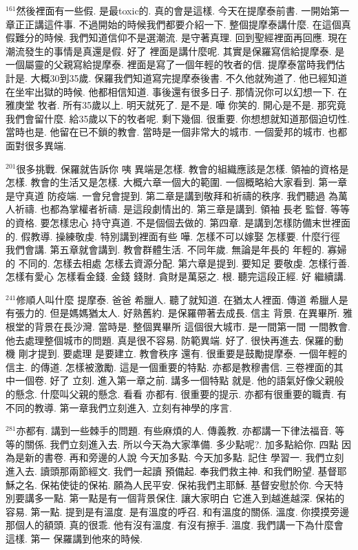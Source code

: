 \documentclass{book}
\begin{document}
$^{161}$然後裡面有一些假.
是最toxic的.
真的會是這樣.
今天在提摩泰前書.
一開始第一章正正講這件事.
不過開始的時候我們都要介紹一下.
整個提摩泰講什麼.
在這個真假難分的時候.
我們知道信仰不是選潮流.
是守著真理.
回到聖經裡面再回應.
現在潮流發生的事情是真還是假.
好了 裡面是講什麼呢.
其實是保羅寫信給提摩泰.
是一個屬靈的父親寫給提摩泰.
裡面是寫了一個年輕的牧者的信.
提摩泰當時我們估計是.
大概30到35歲.
保羅我們知道寫完提摩泰後書.
不久他就殉道了.
他已經知道在坐牢出獄的時候.
他都相信知道.
事後還有很多日子.
那情況你可以幻想一下.
在雅庚堂 牧者.
所有35歲以上.
明天就死了.
是不是.
嘩 你笑的.
開心是不是.
那究竟我們會留什麼.
給35歲以下的牧者呢.
剩下幾個.
很重要.
你想想就知道那個迫切性.
當時也是.
他留在已不鎖的教會.
當時是一個非常大的城市.
一個愛邦的城市.
也都面對很多異端.

$^{201}$很多挑戰.
保羅就告訴你 咦 異端是怎樣.
教會的組織應該是怎樣.
領袖的資格是怎樣.
教會的生活又是怎樣.
大概六章一個大的範圍.
一個概略給大家看到.
第一章是守真道 防疫端.
一會兒會提到.
第二章是講到敬拜和祈禱的秩序.
我們聽過 為萬人祈禱.
也都為掌權者祈禱.
是這段劇情出的.
第三章是講到.
領袖 長老 監督.
等等的資格.
要怎樣忠心 持守真道.
不是個個去做的.
第四章.
是講到怎樣防備末世裡面的.
假教導.
操練敬虔.
特別講到裡面有些 嘩.
怎樣不可以嫁娶 怎樣要.
什麼行徑 我們會講.
第五章就會講到.
教會群體生活.
不同年歲.
無論是年長的 年輕的.
寡婦的 不同的.
怎樣去相處 怎樣去資源分配.
第六章是提到.
要知足 要敬虔.
怎樣行善.
怎樣有愛心 怎樣看金錢.
金錢 錢財.
貪財是萬惡之.
根.
聽完這段正經.
好 繼續講.

$^{241}$修順人叫什麼 提摩泰.
爸爸 希臘人.
聽了就知道.
在猶太人裡面.
傳道 希臘人是有張力的.
但是媽媽猶太人.
好熟舊約.
是保羅帶著去成長.
信主 背景.
在異畢所.
雅根堂的背景在長沙灣.
當時是.
整個異畢所 這個很大城市.
是一間第一間 一間教會.
他去處理整個城市的問題.
真是很不容易.
防範異端.
好了.
很快再進去.
保羅的動機 剛才提到.
要處理 是要建立.
教會秩序 還有.
很重要是鼓勵提摩泰.
一個年輕的信主.
的傳道.
怎樣被激勵.
這是一個重要的特點.
亦都是教穆書信.
三卷裡面的其中一個卷.
好了 立刻.
進入第一章之前.
講多一個特點 就是.
他的語氣好像父親般的懸念.
什麼叫父親的懸念.
看看 亦都有.
很重要的提示.
亦都有很重要的職責.
有不同的教導.
第一章我們立刻進入.
立刻有神學的序言.

$^{281}$亦都有.
講到一些棘手的問題.
有些麻煩的人.
傳義教.
亦都講一下律法福音.
等等的關係.
我們立刻進入去.
所以今天為大家準備.
多少點呢?.
加多點給你.
四點 因為是新的書卷.
再和旁邊的人說 今天加多點.
今天加多點.
記住 學習一.
我們立刻進入去.
讀頭那兩節經文.
我們一起讀 預備起.
奉我們救主神.
和我們盼望.
基督耶穌之名.
保祐使徒的保祐.
願為人民平安.
保祐我們主耶穌.
基督安慰於你.
今天特別要講多一點.
第一點是有一個背景保住.
讓大家明白 它進入到越進越深.
保祐的容易.
第一點.
提到是有溫度.
是有溫度的呼召.
和有溫度的關係.
溫度.
你摸摸旁邊那個人的額頭.
真的很乖.
他有沒有溫度.
有沒有擦手.
溫度.
我們講一下為什麼會這樣.
第一 保羅講到他來的時候.
\end{document}
